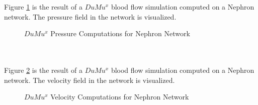 Figure \ref{fig:nephron2_pressure}  is the result of a $DuMu^x$ blood flow simulation computed on a Nephron network. The pressure field in the network is visualized.\\
\begin{figure}[h]
\caption{\footnotesize $DuMu^x$ Pressure Computations for Nephron Network}
\label{fig:nephron2_pressure}
\end{figure}\\
%
\\Figure \ref{fig:nephron2_velocity}  is the result of a $DuMu^x$ blood flow simulation computed on a Nephron network. The velocity field in the network is visualized.\\
\begin{figure}[h]
\caption{\footnotesize $DuMu^x$ Velocity Computations for Nephron Network}
\label{fig:nephron2_velocity}
\end{figure}\\\\

